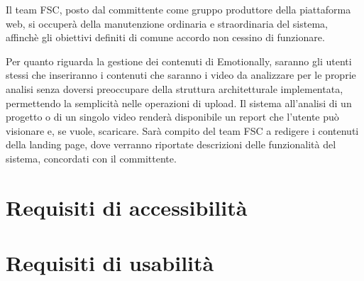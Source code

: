 Il team FSC, posto dal committente come gruppo produttore della piattaforma 
web, si occuperà della manutenzione ordinaria e straordinaria del sistema, 
affinchè gli obiettivi definiti di comune accordo non cessino di funzionare.

Per quanto riguarda la gestione dei contenuti di Emotionally, saranno gli 
utenti stessi che inseriranno i contenuti che saranno i video da analizzare per 
le proprie analisi senza doversi preoccupare della struttura architetturale 
implementata, permettendo la semplicità nelle operazioni di upload. Il sistema 
all'analisi di un progetto o di un singolo video renderà disponibile un report 
che l'utente può visionare e, se vuole, scaricare. 
Sarà compito del team FSC a redigere i contenuti della landing page, dove 
verranno riportate descrizioni delle funzionalità del sistema, concordati con 
il committente.

\section{Requisiti di accessibilità}\label{sec:requisiti-di-accessibilita}

\section{Requisiti di usabilità}\label{sec:requisiti-di-usabilita}
